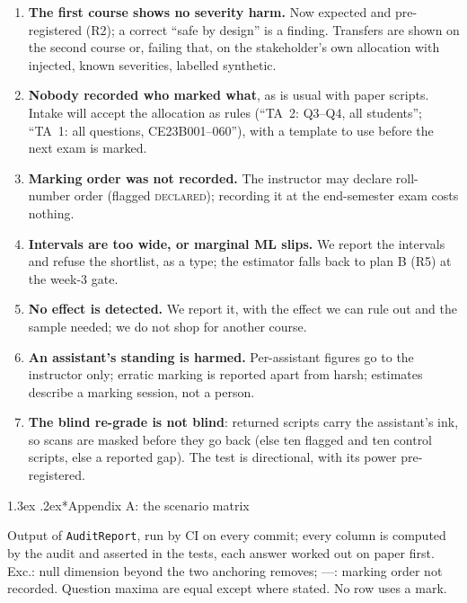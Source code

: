 \documentclass[10pt,a4paper]{article}
\makeatletter
\renewcommand\section{\@startsection{section}{1}{\z@}{-2.8ex \@plus -.6ex \@minus -.2ex}%
  {1.3ex \@plus .2ex}{\normalfont\Large\bfseries}}
\makeatother
\begin{document}
\begin{enumerate}[label=\arabic*.]
\item \textbf{The first course shows no severity harm.} Now expected and pre-registered (R2); a correct
``safe by design'' is a finding. Transfers are shown on the second course or, failing that, on the
stakeholder's own allocation with injected, known severities, labelled synthetic.
\item \textbf{Nobody recorded who marked what}, as is usual with paper scripts. Intake will accept the
allocation as rules (``TA~2: Q3--Q4, all students''; ``TA~1: all questions, CE23B001--060''), with a
template to use before the next exam is marked.
\item \textbf{Marking order was not recorded.} The instructor may declare roll-number order (flagged
\textsc{declared}); recording it at the end-semester exam costs nothing.
\item \textbf{Intervals are too wide, or marginal ML slips.} We report the intervals and refuse the
shortlist, as a type; the estimator falls back to plan B (R5) at the week-3 gate.
\item \textbf{No effect is detected.} We report it, with the effect we can rule out and the sample
needed; we do not shop for another course.
\item \textbf{An assistant's standing is harmed.} Per-assistant figures go to the instructor only;
erratic marking is reported apart from harsh; estimates describe a marking session, not a person.
\item \textbf{The blind re-grade is not blind}: returned scripts carry the assistant's ink, so scans
are masked before they go back (else ten flagged and ten control scripts, else a reported gap). The
test is directional, with its power pre-registered.
\end{enumerate}

\appendix
\section*{Appendix A: the scenario matrix}

Output of \texttt{AuditReport}, run by CI on every commit; every column is computed by the audit and
asserted in the tests, each answer worked out on paper first. Exc.: null dimension beyond the two
anchoring removes; ---: marking order not recorded. Question maxima are equal except where stated.
No row uses a mark.
\end{document}
